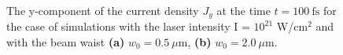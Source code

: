 \begin{figure}[h!]
	\centering
	\\[2mm]
	\caption{The y-component of the current density $ J_{y} $ at the time $ t = 100 \ \mathrm{fs} $ for the case of simulations with the laser intensity I = $ 10^{21} $ W/cm$^2$ and with the beam waist \textbf{(a)} $ w_0 = 0.5 \ \mu\mathrm{m} $, \textbf{(b)} $ w_0 = 2.0 \ \mu\mathrm{m} $.}
	\label{fig:18}
\end{figure}

